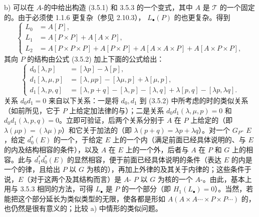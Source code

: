 b) 可以在 $A$-的中给出构造 (3.5.1) 和 3.5.3 的一个变式，其中 $A$ 是 $\mathcal T$ 的一个固定的。由于必须使 1.1.6 更复杂（参见 2.10.3）， $L_\bullet(P)$ 的也更复杂。得到
\[
\left\{\begin{aligned}
L_0&=A[P],\\
L_1&=A[P\times P]+A[A\times P],\\
L_2&=A[P\times P\times P]+A[P\times P]+A[A\times A\times P]+A[A\times P\times P],
\end{aligned}\right.\tag{3.5.5}
\]
其向 $P$ 的结构由公式 (3.5.2) 加上下面的公式给出：
\[
\left\{\begin{aligned}
d_0[\lambda,p]&=[\lambda p]-\lambda[p],\\
d_1[\lambda,\mu,p]&=[\lambda,\mu p]-[\lambda\mu,p]+\lambda[\mu,p],\\
d_1[\lambda,p,q]&=[\lambda,p+q]-[\lambda,p]-[\lambda,q]+\lambda[p,q]-[\lambda p,\lambda q].
\end{aligned}\right.\tag{3.5.6}
\]
关系 $d_0d_1=0$ 来自以下关系：一是将 $d_0,d_1$ 到 (3.5.2) 中所考虑的时的类似关系（如前所见，它于 $P$ 上给定加法律的与）；二是关系 $d_0d_1(\lambda,\mu,p)=0$ 和 $d_0d_1(\lambda,p,q)=0$。立即可验证，后两个关系分别于
$A$ 在 $P$ 上给定的（即 $\lambda(\mu p)=(\lambda\mu)p$）和它关于加法的（即 $\lambda(p+q)=\lambda p+\lambda q$）。对一个 $G_P$- $E$，给定 $d_0^*(E)$ 的一个，于给定 $E$ 上的一个内（满足前面已经具体说明的、与 $E$ 的内及结构相容的条件），以及 $A$ 在 $E$ 上的一个外，后者与 $A$ 在 $P$ 和 $G$ 上的相容。此与 $d_1^*d_0^*(E)$ 的显然相容，便于前面已经具体说明的条件（表达 $E$ 的内是一个的律，且给出 $P$ 以 $G$ 为核的），再加上外律的及其关于内律的；这些条件于说，$E$（对于这两个及其结构而言）是 $A$- $P$ 以 $G$ 为核的一个 $A$-。由此，基本上用与 3.5.3 相同的方法，可得 $L_\bullet$ 是 $P$ 的一个部分（即 $H_1(L_\bullet)=0$）。当然，若能把这个部分延长为类似类型的无限，使各都是形如 $A(A\times A\cdots\times P\times P\cdots)$ 的，也仍然是很有意义的；比较 a) 中情形的类似问题。

